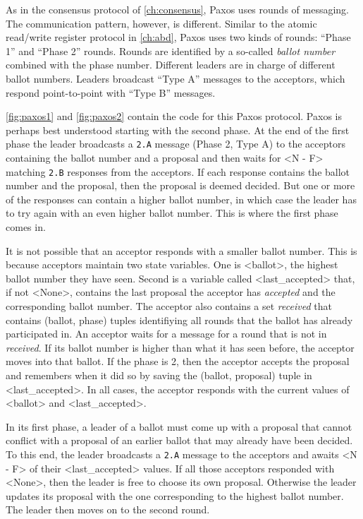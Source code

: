 \documentclass{report}
\begin{document}
As in the consensus protocol of \autoref{ch:consensus}, Paxos uses rounds of messaging.
The communication pattern, however, is different.
Similar to the atomic read/write register protocol in \autoref{ch:abd},
Paxos uses two kinds of rounds: ``Phase 1'' and ``Phase 2'' rounds.
Rounds are identified by a so-called
\emph{ballot number} combined with the phase number.
Different leaders are in charge of different ballot numbers.
Leaders broadcast ``Type A''
messages to the acceptors, which respond point-to-point with ``Type B''
messages.

\autoref{fig:paxos1} and \autoref{fig:paxos2} contain the code for
this Paxos protocol.  Paxos is perhaps best understood starting
with the second phase.  At the end of the first phase the leader
broadcasts a \texttt{2.A} message (Phase 2, Type A) to the acceptors
containing the ballot number and a proposal and then waits for
<{N - F}> matching \texttt{2.B} responses from the
acceptors.  If each response contains the ballot number and the
proposal, then the proposal is deemed decided.  But one or more of
the responses can contain a higher ballot number, in which case the
leader has to try again with an even higher ballot number.  This is
where the first phase comes in.

It is not possible that an acceptor responds with a smaller ballot
number.  This is because acceptors maintain two state variables.
One is <{ballot}>, the highest ballot number they have seen.
Second is a variable called <{last_accepted}> that, if not
<{None}>, contains the last proposal the acceptor has
\emph{accepted} and the corresponding ballot number.  The acceptor
also contains a set \emph{received} that contains (ballot, phase)
tuples identifiying all rounds that the ballot has already participated
in.  An acceptor waits for a message for a round that is not in
\emph{received}.  If its ballot number is higher than what it has
seen before, the acceptor moves into that ballot.  If the phase is
2, then the acceptor accepts the proposal and remembers when it did
so by saving the (ballot, proposal) tuple in <{last_accepted}>.
In all cases, the acceptor responds with the current values of
<{ballot}> and <{last_accepted}>.

In its first phase, a leader of a ballot must come up with a proposal that
cannot conflict with a proposal of an earlier ballot that may already
have been decided.  To this end, the leader broadcasts a \texttt{2.A}
message to the acceptors and awaits <{N - F}> of their <{last_accepted}>
values.  If all those acceptors responded with <{None}>, then the leader
is free to choose its own proposal.  Otherwise the leader updates
its proposal with the one corresponding to the highest ballot number.
The leader then moves on to the second round.
\end{document}
